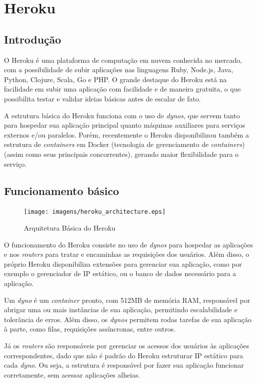 \chapter{Heroku}

\section{Introdução}
O Heroku é uma plataforma de computação em nuvem conhecida no mercado, com a possibilidade de subir aplicações nas linguagens Ruby, Node.js, Java, Python, Clojure, Scala, Go e PHP. O grande destaque do Heroku está na facilidade em subir uma aplicação com facilidade e de maneira gratuita, o que possibilita testar e validar ideias básicas antes de escalar de fato.

A estrutura básica do Heroku funciona com o uso de \textit{dynos}, que servem tanto para hospedar sua aplicação principal quanto máquinas auxiliares para serviços externos e/ou paralelos. Porém, recentemente o Heroku disponibilizou também a estrutura de \textit{containers} em Docker (tecnologia de gerenciamento de \textit{containers}) (assim como seus principais concorrentes), gerando maior flexibilidade para o serviço.

\section{Funcionamento básico}

\begin{figure}[h!]
  \centering
  \texttt{[image: imagens/heroku\_architecture.eps]}
  \caption{Arquitetura Básica do Heroku\cite{safariheroku}}
\end{figure}

O funcionamento do Heroku consiste no uso de \textit{dynos} para hospedar as aplicações e nos \textit{routers} para tratar e encaminhas as requisições dos usuários. Além disso, o próprio Heroku disponibiliza extensões para gerenciar sua aplicação, como por exemplo o gerenciador de IP estático, ou o banco de dados necessário para a aplicação.

Um \textit{dyno} é um \textit{container} pronto, com 512MB de memória RAM, responsável por abrigar uma ou mais instâncias de sua aplicação, permitindo escalabilidade e tolerância de erros. Além disso, os \textit{dynos} permitem rodas tarefas de sua aplicação à parte, como filas, requisições assíncronas, entre outros.

Já os \textit{routers} são responsáveis por gerenciar os acessos dos usuários às aplicações correspondentes, dado que não é padrão do Heroku estruturar IP estático para cada \textit{dyno}. Ou seja, a estrutura é responsável por fazer sua aplicação funcionar corretamente, sem acessar aplicações alheias.


